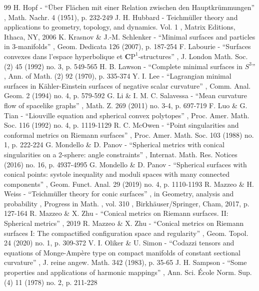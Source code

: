 \documentclass[11pt]{article}
\theoremstyle{definition}
\begin{document}
\begin{thebibliography}{99}
 H. Hopf - “Über Flächen mit einer Relation zwischen den Hauptkrümmungen” , Math. Nachr. 4 (1951), p. 232-249
 J. H. Hubbard - Teichmüller theory and applications to geometry, topology, and dynamics. Vol. 1 , Matrix Editions, Ithaca, NY, 2006
 K. Krasnov \& J.-M. Schlenker - “Minimal surfaces and particles in 3-manifolds” , Geom. Dedicata 126 (2007), p. 187-254
 F. Labourie - “Surfaces convexes dans l’espace hyperbolique et ${\mathbf{C}}\textrm{P}^1$-structures” , J. London Math. Soc. (2) 45 (1992) no. 3, p. 549-565
 H. B. Lawson - “Complete minimal surfaces in $S^ 3$” , Ann. of Math. (2) 92 (1970), p. 335-374
 Y. I. Lee - “Lagrangian minimal surfaces in Kähler-Einstein surfaces of negative scalar curvature” , Comm. Anal. Geom. 2 (1994) no. 4, p. 579-592
 G. Li \& I. M. C. Salavessa - “Mean curvature flow of spacelike graphs” , Math. Z. 269 (2011) no. 3-4, p. 697-719
 F. Luo \& G. Tian - “Liouville equation and spherical convex polytopes” , Proc. Amer. Math. Soc. 116 (1992) no. 4, p. 1119-1129
 R. C. McOwen - “Point singularities and conformal metrics on Riemann surfaces” , Proc. Amer. Math. Soc. 103 (1988) no. 1, p. 222-224
 G. Mondello \& D. Panov - “Spherical metrics with conical singularities on a 2-sphere: angle constraints” , Internat. Math. Res. Notices (2016) no. 16, p. 4937-4995
 G. Mondello \& D. Panov - “Spherical surfaces with conical points: systole inequality and moduli spaces with many connected components” , Geom. Funct. Anal. 29 (2019) no. 4, p. 1110-1193
 R. Mazzeo \& H. Weiss - “Teichmüller theory for conic surfaces” , in Geometry, analysis and probability , Progress in Math. , vol. 310 , Birkhäuser/Springer, Cham, 2017, p. 127-164
 R. Mazzeo \& X. Zhu - “Conical metrics on Riemann surfaces. II: Spherical metrics” , 2019
 R. Mazzeo \& X. Zhu - “Conical metrics on Riemann surfaces I: The compactified configuration space and regularity” , Geom. Topol. 24 (2020) no. 1, p. 309-372
 V. I. Oliker \& U. Simon - “Codazzi tensors and equations of Monge-Ampère type on compact manifolds of constant sectional curvature” , J. reine angew. Math. 342 (1983), p. 35-65
 J. H. Sampson - “Some properties and applications of harmonic mappings” , Ann. Sci. École Norm. Sup. (4) 11 (1978) no. 2, p. 211-228

\end{thebibliography}
\end{document}
